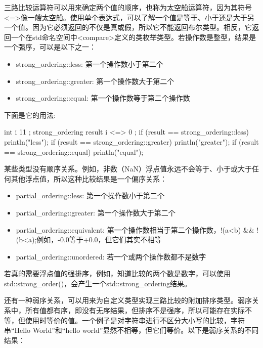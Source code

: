 
三路比较运算符可以用来确定两个值的顺序，也称为太空船运算符，因为其符号<=>像一艘太空船。使用单个表达式，可以了解一个值是等于、小于还是大于另一个值。因为它必须返回的不仅是真或假，所以它不能返回布尔类型。相反，它返回一个在std命名空间中<compare>定义的类枚举类型。若操作数是整型，结果是一个强序，可以是以下之一：

\begin{itemize}
\item
strong\_ordering::less: 第一个操作数小于第二个

\item
strong\_ordering::greater: 第一个操作数大于第二个

\item
strong\_ordering::equal: 第一个操作数等于第二个操作数
\end{itemize}

下面是它的用法:

\begin{cpp}
int i { 11 };
strong_ordering result { i <=> 0 };
if (result == strong_ordering::less) { println("less"); }
if (result == strong_ordering::greater) { println("greater"); }
if (result == strong_ordering::equal) { println("equal"); }
\end{cpp}

某些类型没有顺序关系。例如，非数（NaN）浮点值永远不会等于、小于或大于任何其他浮点值，所以这种比较结果是一个偏序关系：

\begin{itemize}
\item
partial\_ordering::less: 第一个操作数小于第二个

\item
partial\_ordering::greater: 第一个操作数大于第二个

\item
partial\_ordering::equivalent: 第一个操作数相当于第二个操作数，!(a<b) \&\& !(b<a);例如，-0.0等于+0.0，但它们其实不相等

\item
partial\_ordering::unordered: 若一个或两个操作数都不是数字
\end{itemize}

若真的需要浮点值的强排序，例如，知道比较的两个数是数字，可以使用std::strong\_order()，会产生一个std::strong\_ordering结果。

还有一种弱序关系，可以用来为自定义类型实现三路比较的附加排序类型。弱序关系中，所有值都有序，即没有无序结果，但排序不是强序，所以可能存在实际不等，但使用时等价的值。一个例子是对字符串进行不区分大小写的比较，字符串“Hello World”和“hello world”显然不相等，但它们等价。以下是弱序关系的不同结果：


